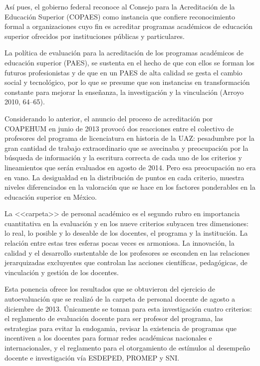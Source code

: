 {Así pues, el gobierno federal reconoce al Consejo para la Acreditación de la
Educación Superior (COPAES) como instancia que confiere reconocimiento
formal a organizaciones cuyo fin es acreditar programas académicos de
educación superior ofrecidos por instituciones públicas y particulares.

 
La política de evaluación para la acreditación de los programas académicos
de educación superior (PAES), se sustenta en el hecho de que con ellos se
forman los futuros profesionistas y de que en un  PAES de alta calidad se
gesta el cambio social y tecnológico, por lo que se presume que son
instancias en transformación constante para mejorar la enseñanza, la
investigación y la vinculación (Arroyo 2010, 64--65). 
\newpage

Considerando lo anterior, el anuncio del proceso de acreditación por
COAPEHUM en junio de 2013 provocó dos reacciones entre el colectivo de
profesores del programa de licenciatura en historia de la UAZ: pesadumbre
por la gran cantidad de trabajo extraordinario que se avecinaba y
preocupación por la búsqueda de información y la escritura correcta de cada
uno de los criterios y lineamientos que serán evaluados en agosto de 2014.
Pero esa preocupación no era en vano. La desigualdad en la distribución de
puntos en cada criterio, muestra niveles diferenciados en la valoración que
se hace en los factores ponderables en la educación superior en México. 

La <<carpeta>> de personal académico es el segundo rubro en importancia
cuantitativa en la evaluación y en los nueve criterios subyacen tres
dimensiones: lo real, lo posible y lo deseable de los docentes, el programa
y la institución. La relación entre estas tres esferas pocas veces es
armoniosa. La innovación, la calidad y el desarrollo sustentable de los
profesores se esconden en las relaciones jerarquizadas excluyentes que
controlan las acciones científicas, pedagógicas, de vinculación y gestión
de los docentes. 

Esta ponencia ofrece los resultados que se obtuvieron del ejercicio de
autoevaluación que se realizó de la carpeta de personal docente de agosto a
diciembre de 2013. Únicamente se toman para esta investigación cuatro
criterios: el reglamento de evaluación docente para ser profesor del
programa,  las estrategias para evitar la endogamia,  revisar la existencia
de programas que incentiven a los docentes para formar redes académicas
nacionales e internacionales, y el reglamento para el otorgamiento de
estímulos al desempeño docente e investigación vía ESDEPED, PROMEP y SNI. 
\newpage

}
